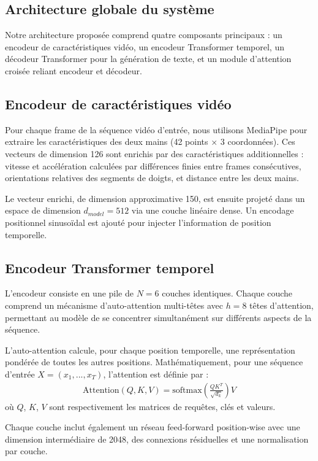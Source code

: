 \documentclass[twocolumn]{el-author}
\begin{document}
\subsection{Architecture globale du système}

Notre architecture proposée comprend quatre composants principaux : un encodeur de caractéristiques vidéo, un encodeur Transformer temporel, un décodeur Transformer pour la génération de texte, et un module d'attention croisée reliant encodeur et décodeur.

\subsection{Encodeur de caractéristiques vidéo}

Pour chaque frame de la séquence vidéo d'entrée, nous utilisons MediaPipe pour extraire les caractéristiques des deux mains (42 points × 3 coordonnées). Ces vecteurs de dimension 126 sont enrichis par des caractéristiques additionnelles : vitesse et accélération calculées par différences finies entre frames consécutives, orientations relatives des segments de doigts, et distance entre les deux mains.

Le vecteur enrichi, de dimension approximative 150, est ensuite projeté dans un espace de dimension $d_{model} = 512$ via une couche linéaire dense. Un encodage positionnel sinusoïdal est ajouté pour injecter l'information de position temporelle.

\subsection{Encodeur Transformer temporel}

L'encodeur consiste en une pile de $N = 6$ couches identiques. Chaque couche comprend un mécanisme d'auto-attention multi-têtes avec $h = 8$ têtes d'attention, permettant au modèle de se concentrer simultanément sur différents aspects de la séquence.

L'auto-attention calcule, pour chaque position temporelle, une représentation pondérée de toutes les autres positions. Mathématiquement, pour une séquence d'entrée $X = (x_1, ..., x_T)$, l'attention est définie par :
\begin{align}
\text{Attention}(Q, K, V) = \text{softmax}\left(\frac{QK^T}{\sqrt{d_k}}\right)V
\end{align}
où $Q$, $K$, $V$ sont respectivement les matrices de requêtes, clés et valeurs.

Chaque couche inclut également un réseau feed-forward position-wise avec une dimension intermédiaire de 2048, des connexions résiduelles et une normalisation par couche.
\end{document}
